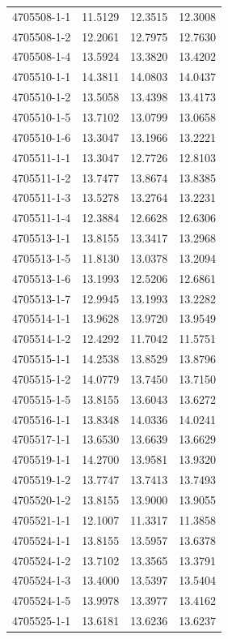 \begin{longtable}{lrrr}
4705508-1-1 & 11.5129 & 12.3515 & 12.3008 \\
4705508-1-2 & 12.2061 & 12.7975 & 12.7630 \\
4705508-1-4 & 13.5924 & 13.3820 & 13.4202 \\
4705510-1-1 & 14.3811 & 14.0803 & 14.0437 \\
4705510-1-2 & 13.5058 & 13.4398 & 13.4173 \\
4705510-1-5 & 13.7102 & 13.0799 & 13.0658 \\
4705510-1-6 & 13.3047 & 13.1966 & 13.2221 \\
4705511-1-1 & 13.3047 & 12.7726 & 12.8103 \\
4705511-1-2 & 13.7477 & 13.8674 & 13.8385 \\
4705511-1-3 & 13.5278 & 13.2764 & 13.2231 \\
4705511-1-4 & 12.3884 & 12.6628 & 12.6306 \\
4705513-1-1 & 13.8155 & 13.3417 & 13.2968 \\
4705513-1-5 & 11.8130 & 13.0378 & 13.2094 \\
4705513-1-6 & 13.1993 & 12.5206 & 12.6861 \\
4705513-1-7 & 12.9945 & 13.1993 & 13.2282 \\
4705514-1-1 & 13.9628 & 13.9720 & 13.9549 \\
4705514-1-2 & 12.4292 & 11.7042 & 11.5751 \\
4705515-1-1 & 14.2538 & 13.8529 & 13.8796 \\
4705515-1-2 & 14.0779 & 13.7450 & 13.7150 \\
4705515-1-5 & 13.8155 & 13.6043 & 13.6272 \\
4705516-1-1 & 13.8348 & 14.0336 & 14.0241 \\
4705517-1-1 & 13.6530 & 13.6639 & 13.6629 \\
4705519-1-1 & 14.2700 & 13.9581 & 13.9320 \\
4705519-1-2 & 13.7747 & 13.7413 & 13.7493 \\
4705520-1-2 & 13.8155 & 13.9000 & 13.9055 \\
4705521-1-1 & 12.1007 & 11.3317 & 11.3858 \\
4705524-1-1 & 13.8155 & 13.5957 & 13.6378 \\
4705524-1-2 & 13.7102 & 13.3565 & 13.3791 \\
4705524-1-3 & 13.4000 & 13.5397 & 13.5404 \\
4705524-1-5 & 13.9978 & 13.3977 & 13.4162 \\
4705525-1-1 & 13.6181 & 13.6236 & 13.6237 \\

\end{longtable}
